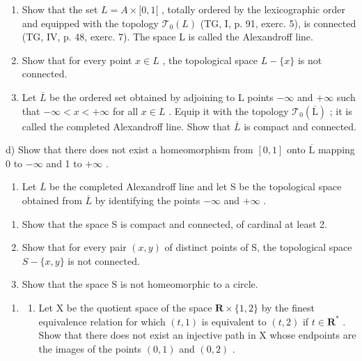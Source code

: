 \begin{enumerate}
\def\labelenumi{\alph{enumi})}
\item
  Show that the set \(L = A \times [0, 1[\) , totally ordered by the lexicographic order and equipped with the topology \(\mathcal{T}_{0}(L)\) (TG, I, p. 91, exerc. 5), is connected (TG, IV, p. 48, exerc. 7). The space L is called the Alexandroff line.
\item
  Show that for every point \(x \in L\) , the topological space \(L - \{x\}\) is not connected.
\item
  Let \(\overline{L}\) be the ordered set obtained by adjoining to L points \(-\infty\) and \(+\infty\) such that \(-\infty < x < +\infty\) for all \(x \in L\) . Equip it with the topology \(\mathcal{T}_{0}(\overline{\mathrm{L}})\) ; it is called the completed Alexandroff line. Show that \(\overline{L}\) is compact and connected.
\end{enumerate}

d) Show that there does not exist a homeomorphism from \([0,1]\) onto \(\overline{\mathrm{L}}\) mapping 0 to \(-\infty\) and 1 to \(+\infty\) .

\begin{enumerate}
\def\labelenumi{\arabic{enumi})}
\setcounter{enumi}{9}
\tightlist
\item
  Let \(\overline{L}\) be the completed Alexandroff line and let S be the topological space obtained from \(\overline{L}\) by identifying the points \(-\infty\) and \(+\infty\) .
\end{enumerate}

\begin{enumerate}
\def\labelenumi{\alph{enumi})}
\item
  Show that the space S is compact and connected, of cardinal at least 2.
\item
  Show that for every pair \((x,y)\) of distinct points of S, the topological space \(S-\{x,y\}\) is not connected.
\item
  Show that the space S is not homeomorphic to a circle.
\end{enumerate}

\begin{enumerate}
\def\labelenumi{\arabic{enumi})}
\setcounter{enumi}{10}
\tightlist
\item
  \begin{enumerate}
  \def\labelenumii{\alph{enumii})}
  \tightlist
  \item
    Let X be the quotient space of the space \(\mathbf{R} \times \{1, 2\}\) by the finest equivalence relation for which \((t, 1)\) is equivalent to \((t, 2)\) if \(t \in \mathbf{R}^*\) . Show that there does not exist an injective path in X whose endpoints are the images of the points \((0, 1)\) and \((0, 2)\) .
  \end{enumerate}
\end{enumerate}

